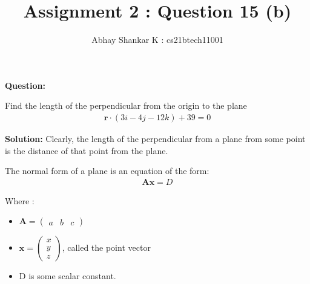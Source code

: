 \documentclass[journal,11pt,twocolumn]{IEEEtran}
\begin{document}
	\title{Assignment 2 : Question 15 (b)}
	\author{ Abhay Shankar K : cs21btech11001}

	\maketitle

	\bigskip

	\providecommand{\brak}[1]{\ensuremath{\left(#1\right)}}
	\providecommand{\abs}[1]{\left\vert#1\right\vert}
	\providecommand{\norm}[1]{\left\lVert#1\right\rVert}
	\newcommand{\solution}{\noindent \textbf{Solution: }}
	\newcommand{\question}{\noindent \textbf{Question: }}

	\newcommand{\myvec}[1]{\ensuremath{\begin{pmatrix}#1\end{pmatrix}}}
	\newcommand{\mydet}[1]{\ensuremath{\begin{vmatrix}#1\end{vmatrix}}}

	\makeatletter
	\makeatother
	\let\StandardTheFigure\thefigure
	\let\vec\mathbf

	\question

	Find the length of the perpendicular from the origin to the plane
	\begin{align} \label{given}
		\vec{r} \cdot \brak{3i - 4j - 12k} + 39 = 0
	\end{align}

	\solution
	Clearly, the length of the perpendicular from a plane from some point is the distance of that point from the plane.

	The normal form of a plane is an equation of the form:
	\begin{align}\label{Gen_plane}
		\vec{A}\vec{x} = D
	\end{align}

	Where :
	\begin{itemize}
		\item $\vec{A} = \myvec{a & b & c}$
		\item $\vec{x} = \myvec{x \\ y \\ z}$, called the point vector
		\item D is some scalar constant.
	\end{itemize}
\end{document}

